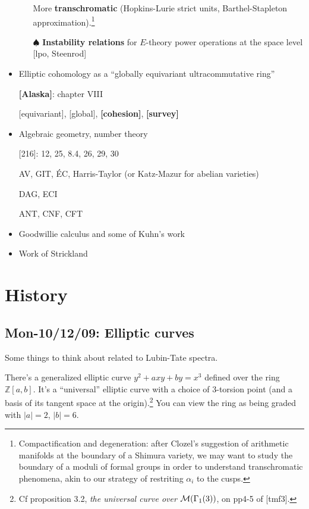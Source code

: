 \documentclass{rs}
\theoremstyle{definition}
\theoremstyle{remark}
\newcommand{\mb}[1]{\mathbb{#1}}
\newcommand{\CM}{{\cal M}}
\newcommand{\BZ}{{\mb Z}}
\newcommand{\A}{\alpha}
\newcommand{\todo}{\spadesuit}
\renewcommand{\=}{\approx}
\renewcommand{\-}{\sim}
\numberwithin{equation}{section}
\numberwithin{thm}{section}
\begin{document}
\begin{itemize}
\begin{itemize}
  More \textbf{transchromatic} (Hopkins-Lurie strict units, Barthel-Stapleton approximation).\footnote{Compactification and degeneration: after Clozel's 
  suggestion of arithmetic manifolds at the boundary of a Shimura variety, we may want to study the boundary of a moduli of formal groups 
  in order to understand transchromatic phenomena, akin to our strategy of restriting $\A_i$ to the cusps.}  

  \item [$\todo$] {\bf Instability relations} for $E$-theory power operations at the space level [lpo, Steenrod] 
 \end{itemize}

 \item Elliptic cohomology as a ``globally equivariant ultracommutative ring'' 

 \textbf{[Alaska]}: chapter VIII 

 [equivariant], [global], \textbf{[cohesion]}, \textbf{[survey]} 

 \item Algebraic geometry, number theory 

 {[216]}: 12, 25, 8.4, 26, 29, 30 

 AV, GIT, \'EC, Harris-Taylor (or Katz-Mazur for abelian varieties) 

 DAG, ECI 

 ANT, CNF, CFT 

 \item Goodwillie calculus and some of Kuhn's work 

 \item Work of Strickland 
\end{itemize}


\newpage
\section{History}
\subsection{Mon-10/12/09: Elliptic curves}
\label{subsec:history}

Some things to think about related to Lubin-Tate spectra.

There's a generalized elliptic curve $y^2 + axy + by = x^3$ defined over
the ring $\BZ[a,b]$.  It's a ``universal'' elliptic curve with a choice of
3-torsion point (and a basis of its tangent space at the origin).\footnote{Cf proposition 3.2, {\em the universal curve over} $\CM(\Gamma_1(3))$, on pp4-5 of [tmf3].  }  You
can view the ring as being graded with $|a| = 2$, $|b| = 6$.
\end{document}
